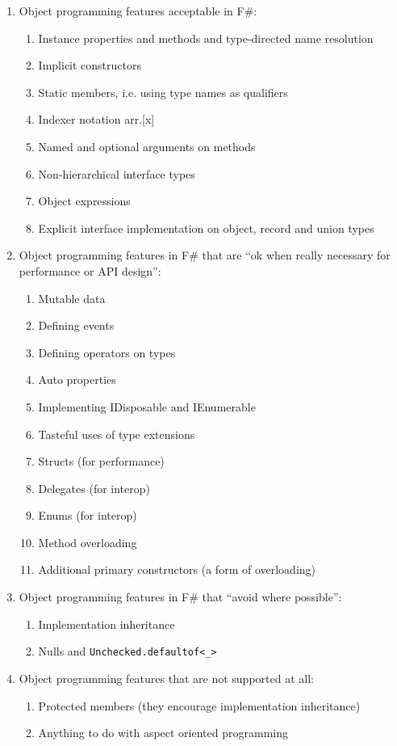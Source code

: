 \documentclass[acmsmall,screen]{acmart}
\begin{document}
\begin{enumerate}
\it
\item Object programming features acceptable in F\#:
\begin{enumerate}
\item Instance properties and methods and type-directed name resolution
\item Implicit constructors 
\item Static members, i.e. using type names as qualifiers
\item Indexer notation arr.[x]  
\item Named and optional arguments on methods
\item Non-hierarchical interface types
\item Object expressions 
\item Explicit interface implementation on object, record and union types
\end{enumerate}

\item Object programming features in F\# that are “ok when really necessary for performance or API design”: 
\begin{enumerate}
\item Mutable data
\item Defining events
\item Defining operators on types
\item Auto properties
\item Implementing IDisposable and IEnumerable
\item Tasteful uses of type extensions
\item Structs (for performance)
\item Delegates (for interop)
\item Enums (for interop)
\item Method overloading
\item Additional primary constructors (a form of overloading)
\end{enumerate}

\item Object programming features in F\# that ``avoid where possible'':

\begin{enumerate}
\item Implementation inheritance
\item Nulls and \texttt{Unchecked.defaultof<\_>}
\end{enumerate}

\item Object programming features that are not supported at all:

\begin{enumerate}
\item Protected members (they encourage implementation inheritance)
\item Anything to do with aspect oriented programming
\end{enumerate}
\end{enumerate}
\end{document}
